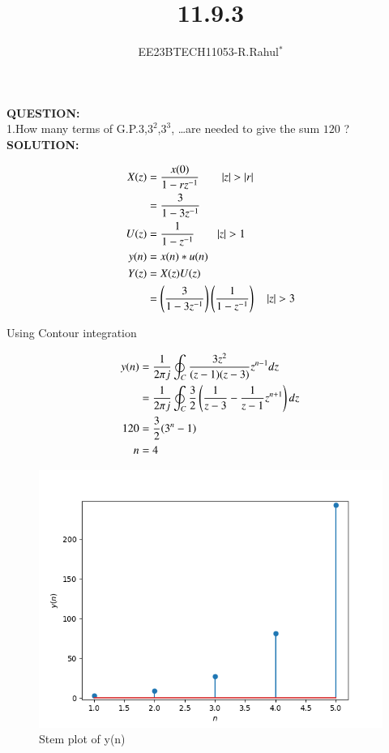 \documentclass[journal,12pt,twocolumn]{IEEEtran}
\theoremstyle{remark}
\begin{document}

\vspace{3cm}
\title{\textbf{11.9.3}}
\author{EE23BTECH11053-R.Rahul$^{*}$%
}
\maketitle
\newpage
\bigskip

\textbf{QUESTION:}\\
1.How many terms of G.P.$3$,$3^2$,$3^3$, \ldots are needed to give the sum $120$ ?\\

\textbf{SOLUTION:}\\
\vspace{-0.25cm}

\begin{center}
    
\begin{align}
      X(z)&=\frac{x(0)}{1-rz^{-1}} \qquad |z|>|r|\\
      &=\frac{3}{1-3z^{-1}}\\
      U(z)&=\frac{1}{1-z^{-1}} \qquad |z|>1\\
      y(n)&= x(n)*u(n)\\
      Y(z)&=X(z)U(z)\\
&=\brak{ \frac{3}{1-3z^{-1}}}\brak{\frac{1}{1-z^{-1}}}\quad|z| > 3 \end{align}
\end{center}
Using Contour integration\\
\begin{center}
 \begin{align}
   y(n)&=\frac{1}{2\pi j}\oint_C \frac{3 z^2}{(z-1)(z-3)}z^{n-1} dz\\
   &=\frac{1}{2 \pi j}\oint_C \frac{3}{2} \left(\frac{1}{z-3} - \frac{1}{z-1}z^{n+1}\right)dz\\
   120&= \frac{3}{2}(3^{n}- 1)\\
   n&=4
 \end{align}
\end{center}

\begin{figure}[h]
  
  \includegraphics[width=\columnwidth]{figs/graph.png}
  \caption{Stem plot of y(n)}
  \label{fig:your_label}
\end{figure}
\end{document}
